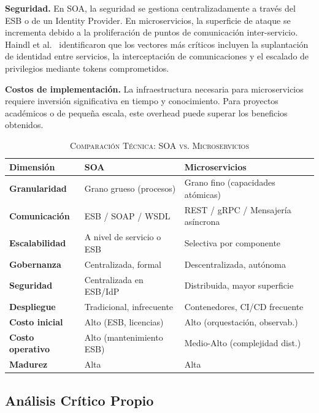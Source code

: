 \documentclass[10pt,twocolumn,letterpaper]{article}
\begin{document}
\textbf{Seguridad.} En SOA, la seguridad se gestiona centralizadamente a través del ESB o de un Identity Provider. En microservicios, la superficie de ataque se incrementa debido a la proliferación de puntos de comunicación inter-servicio. Haindl et al.~\cite{b4} identificaron que los vectores más críticos incluyen la suplantación de identidad entre servicios, la interceptación de comunicaciones y el escalado de privilegios mediante tokens comprometidos.

\textbf{Costos de implementación.} La infraestructura necesaria para microservicios requiere inversión significativa en tiempo y conocimiento. Para proyectos académicos o de pequeña escala, este overhead puede superar los beneficios obtenidos.

\begin{table}[htbp]
\caption{\textsc{Comparación Técnica: SOA vs. Microservicios}}
\label{tab:comp}
\renewcommand{\arraystretch}{1.2}
\setlength{\tabcolsep}{4pt}
\begin{tabular}{>{\bfseries\small}p{1.6cm} >{\small}p{2.4cm} >{\small}p{2.4cm}}
\toprule
\small\textbf{Dimensión} & \small\textbf{SOA} & \small\textbf{Microservicios} \\
\midrule
Granularidad & Grano grueso (procesos) & Grano fino (capacidades atómicas) \\
Comunicación & ESB / SOAP / WSDL & REST / gRPC / Mensajería asíncrona \\
Escalabilidad & A nivel de servicio o ESB & Selectiva por componente \\
Gobernanza & Centralizada, formal & Descentralizada, autónoma \\
Seguridad & Centralizada en ESB/IdP & Distribuida, mayor superficie \\
Despliegue & Tradicional, infrecuente & Contenedores, CI/CD frecuente \\
Costo inicial & Alto (ESB, licencias) & Alto (orquestación, observab.) \\
Costo operativo & Alto (mantenimiento ESB) & Medio-Alto (complejidad dist.) \\
Madurez & Alta & Alta \\
\bottomrule
\end{tabular}
\end{table}

\subsection{Análisis Crítico Propio}
\end{document}
